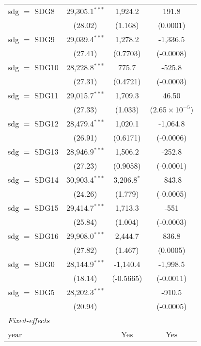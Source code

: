 \begin{tabular}{lccc}
   sdg $=$ SDG8  & 29,305.1$^{***}$ & 1,924.2          & 191.8\\   
                 & (28.02)          & (1.168)          & (0.0001)\\   
   sdg $=$ SDG9  & 29,039.4$^{***}$ & 1,278.2          & -1,336.5\\   
                 & (27.41)          & (0.7703)         & (-0.0008)\\   
   sdg $=$ SDG10 & 28,228.8$^{***}$ & 775.7            & -525.8\\   
                 & (27.31)          & (0.4721)         & (-0.0003)\\   
   sdg $=$ SDG11 & 29,015.7$^{***}$ & 1,709.3          & 46.50\\   
                 & (27.33)          & (1.033)          & ($2.65\times 10^{-5}$)\\    
   sdg $=$ SDG12 & 28,479.4$^{***}$ & 1,020.1          & -1,064.8\\   
                 & (26.91)          & (0.6171)         & (-0.0006)\\   
   sdg $=$ SDG13 & 28,946.9$^{***}$ & 1,506.2          & -252.8\\   
                 & (27.23)          & (0.9058)         & (-0.0001)\\   
   sdg $=$ SDG14 & 30,903.4$^{***}$ & 3,206.8$^{*}$    & -843.8\\   
                 & (24.26)          & (1.779)          & (-0.0005)\\   
   sdg $=$ SDG15 & 29,414.7$^{***}$ & 1,713.3          & -551\\   
                 & (25.84)          & (1.004)          & (-0.0003)\\   
   sdg $=$ SDG16 & 29,908.0$^{***}$ & 2,444.7          & 836.8\\   
                 & (27.82)          & (1.467)          & (0.0005)\\   
   sdg $=$ SDG0  & 28,144.9$^{***}$ & -1,140.4         & -1,998.5\\   
                 & (18.14)          & (-0.5665)        & (-0.0011)\\   
   sdg $=$ SDG5  & 28,202.3$^{***}$ &                  & -910.5\\   
                 & (20.94)          &                  & (-0.0005)\\   
   \midrule
   \emph{Fixed-effects}\\
   year          &                  & Yes              & Yes\\  

\end{tabular}
